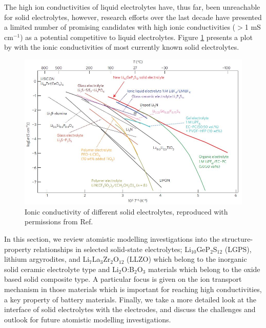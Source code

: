 \documentclass[../main.tex]{subfiles}
\begin{document}
The high ion conductivities of liquid electrolytes have, thus far, been unreachable for solid electrolytes, however, research efforts over the last decade have presented a limited number of promising candidates with high ionic conductivities ($>$1 mS cm$^{-1}$) as a potential competitive to liquid electrolytes.\cite{kanno_synthesis_2000,murayama_synthesis_2002,murayama_material_2004,minafra_influence_2019,bron_li_2013,whiteley_empowering_2014,huang_superionic_2019,yamane_crystal_2007,homma_crystal_2011} Figure \ref{fig:solid-electrolyte} presents a plot by \citeauthor{Kamaya2011} with the ionic conductivities of most currently known solid electrolytes.

\begin{figure}[htbp]
    \centering
    \includegraphics[scale=0.6]{figures/kamaya.jpg}
    \caption{Ionic conductivity of different solid electrolytes, reproduced with permissions from Ref. }
    \label{fig:solid-electrolyte}
\end{figure}

In this section, we review atomistic modelling investigations into the structure-property relationships in selected solid-state electrolytes; Li$_{10}$GeP$_2$S$_{12}$ (LGPS), lithium argyrodites, and Li$_7$La$_3$Zr$_2$O$_{12}$ (LLZO) which belong to the inorganic solid ceramic electrolyte type and Li$_{2}$O:B$_{2}$O$_{3}$ materials which belong to the oxide based solid composite type. A particular focus is given on the ion transport mechanism in those materials which is important for reaching high conductivities, a key property of battery materials. Finally, we take a more detailed look at the interface of solid electrolytes with the electrodes, and discuss the challenges and outlook for future atomistic modelling investigations.
\end{document}
